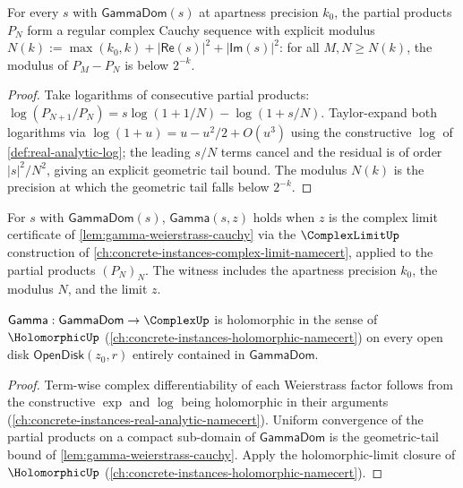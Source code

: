 \begin{lemma}
\label{lem:gamma-weierstrass-cauchy}
For every \(s\) with \(\mathsf{GammaDom}(s)\) at apartness precision \(k_0\), the partial products \(P_N\) form a regular complex Cauchy sequence with explicit modulus \(N(k) := \max(k_0, k) + |\mathsf{Re}(s)|^2 + |\mathsf{Im}(s)|^2\): for all \(M, N \geq N(k)\), the modulus of \(P_M - P_N\) is below \(2^{-k}\).
\end{lemma}
\begin{proof}
Take logarithms of consecutive partial products: \(\log(P_{N+1}/P_N) = s \log(1 + 1/N) - \log(1 + s/N)\). Taylor-expand both logarithms via \(\log(1 + u) = u - u^2/2 + O(u^3)\) using the constructive \(\log\) of \autoref{def:real-analytic-log}; the leading \(s/N\) terms cancel and the residual is of order \(|s|^2/N^2\), giving an explicit geometric tail bound. The modulus \(N(k)\) is the precision at which the geometric tail falls below \(2^{-k}\).
\end{proof}

\begin{definition}
\label{def:gamma}
For \(s\) with \(\mathsf{GammaDom}(s)\), \(\mathsf{Gamma}(s, z)\) holds when \(z\) is the complex limit certificate of \autoref{lem:gamma-weierstrass-cauchy} via the \(\ComplexLimitUp\) construction of \autoref{ch:concrete-instances-complex-limit-namecert}, applied to the partial products \((P_N)_N\). The witness includes the apartness precision \(k_0\), the modulus \(N\), and the limit \(z\).
\end{definition}

\begin{theorem}
\label{thm:gamma-holomorphic}
\(\mathsf{Gamma} : \mathsf{GammaDom} \to \ComplexUp\) is holomorphic in the sense of \(\HolomorphicUp\) (\autoref{ch:concrete-instances-holomorphic-namecert}) on every open disk \(\mathsf{OpenDisk}(z_0, r)\) entirely contained in \(\mathsf{GammaDom}\).
\end{theorem}
\begin{proof}
Term-wise complex differentiability of each Weierstrass factor follows from the constructive \(\exp\) and \(\log\) being holomorphic in their arguments (\autoref{ch:concrete-instances-real-analytic-namecert}). Uniform convergence of the partial products on a compact sub-domain of \(\mathsf{GammaDom}\) is the geometric-tail bound of \autoref{lem:gamma-weierstrass-cauchy}. Apply the holomorphic-limit closure of \(\HolomorphicUp\) (\autoref{ch:concrete-instances-holomorphic-namecert}).
\end{proof}

